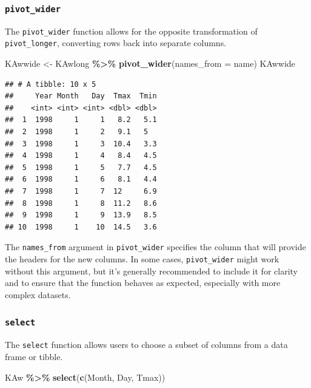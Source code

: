 \documentclass[
]{article}
\newenvironment{Shaded}{\begin{snugshade}}{\end{snugshade}}
\newcommand{\AttributeTok}[1]{\textcolor[rgb]{0.13,0.29,0.53}{#1}}
\newcommand{\FunctionTok}[1]{\textcolor[rgb]{0.13,0.29,0.53}{\textbf{#1}}}
\newcommand{\NormalTok}[1]{#1}
\newcommand{\OtherTok}[1]{\textcolor[rgb]{0.56,0.35,0.01}{#1}}
\newcommand{\SpecialCharTok}[1]{\textcolor[rgb]{0.81,0.36,0.00}{\textbf{#1}}}
\begin{document}
\subsubsection{\texorpdfstring{\texttt{pivot\_wider}}{pivot\_wider}}\label{pivot_wider}

The \texttt{pivot\_wider} function allows for the opposite transformation of \texttt{pivot\_longer}, converting rows back into separate columns.

\begin{Shaded}
\begin{Highlighting}[]
\NormalTok{KAwwide }\OtherTok{\textless{}{-}}\NormalTok{ KAwlong }\SpecialCharTok{\%\textgreater{}\%} \FunctionTok{pivot\_wider}\NormalTok{(}\AttributeTok{names\_from =}\NormalTok{ name) }
\NormalTok{KAwwide}
\end{Highlighting}
\end{Shaded}

\begin{verbatim}
## # A tibble: 10 x 5
##     Year Month   Day  Tmax  Tmin
##    <int> <int> <int> <dbl> <dbl>
##  1  1998     1     1   8.2   5.1
##  2  1998     1     2   9.1   5  
##  3  1998     1     3  10.4   3.3
##  4  1998     1     4   8.4   4.5
##  5  1998     1     5   7.7   4.5
##  6  1998     1     6   8.1   4.4
##  7  1998     1     7  12     6.9
##  8  1998     1     8  11.2   8.6
##  9  1998     1     9  13.9   8.5
## 10  1998     1    10  14.5   3.6
\end{verbatim}

The \texttt{names\_from} argument in \texttt{pivot\_wider} specifies the column that will provide the headers for the new columns. In some cases, \texttt{pivot\_wider} might work without this argument, but it's generally recommended to include it for clarity and to ensure that the function behaves as expected, especially with more complex datasets.

\subsubsection{\texorpdfstring{\texttt{select}}{select}}\label{select}

The \texttt{select} function allows users to choose a subset of columns from a data frame or tibble.

\begin{Shaded}
\begin{Highlighting}[]
\NormalTok{KAw }\SpecialCharTok{\%\textgreater{}\%} \FunctionTok{select}\NormalTok{(}\FunctionTok{c}\NormalTok{(Month, Day, Tmax))}
\end{Highlighting}
\end{Shaded}
\end{document}
